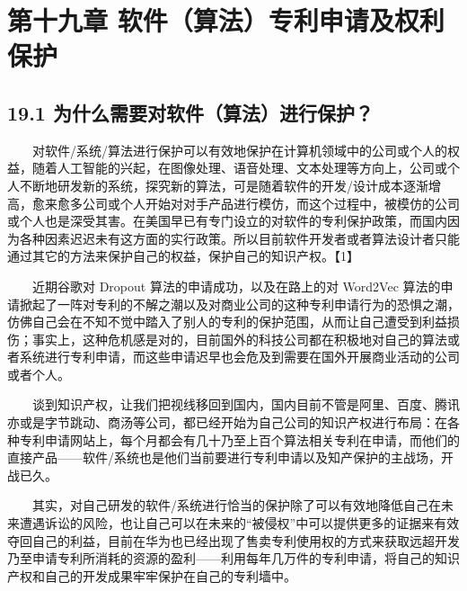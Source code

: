 \chapter{第十九章
软件（算法）专利申请及权利保护}\label{ux7b2cux5341ux4e5dux7ae0-ux8f6fux4ef6ux7b97ux6cd5ux4e13ux5229ux7533ux8bf7ux53caux6743ux5229ux4fddux62a4}


\section{19.1
为什么需要对软件（算法）进行保护？}\label{ux4e3aux4ec0ux4e48ux9700ux8981ux5bf9ux8f6fux4ef6ux7b97ux6cd5ux8fdbux884cux4fddux62a4}

  对软件/系统/算法进行保护可以有效地保护在计算机领域中的公司或个人的权益，随着人工智能的兴起，在图像处理、语音处理、文本处理等方向上，公司或个人不断地研发新的系统，探究新的算法，可是随着软件的开发/设计成本逐渐增高，愈来愈多公司或个人开始对对手产品进行模仿，而这个过程中，被模仿的公司或个人也是深受其害。在美国早已有专门设立的对软件的专利保护政策，而国内因为各种因素迟迟未有这方面的实行政策。所以目前软件开发者或者算法设计者只能通过其它的方法来保护自己的权益，保护自己的知识产权。【1】

  近期谷歌对 Dropout 算法的申请成功，以及在路上的对 Word2Vec
算法的申请掀起了一阵对专利的不解之潮以及对商业公司的这种专利申请行为的恐惧之潮，仿佛自己会在不知不觉中踏入了别人的专利的保护范围，从而让自己遭受到利益损伤；事实上，这种危机感是对的，目前国外的科技公司都在积极地对自己的算法或者系统进行专利申请，而这些申请迟早也会危及到需要在国外开展商业活动的公司或者个人。

  谈到知识产权，让我们把视线移回到国内，国内目前不管是阿里、百度、腾讯亦或是字节跳动、商汤等公司，都已经开始为自己公司的知识产权进行布局：在各种专利申请网站上，每个月都会有几十乃至上百个算法相关专利在申请，而他们的直接产品------软件/系统也是他们当前要进行专利申请以及知产保护的主战场，开战已久。

  其实，对自己研发的软件/系统进行恰当的保护除了可以有效地降低自己在未来遭遇诉讼的风险，也让自己可以在未来的``被侵权''中可以提供更多的证据来有效夺回自己的利益，目前在华为也已经出现了售卖专利使用权的方式来获取远超开发乃至申请专利所消耗的资源的盈利------利用每年几万件的专利申请，将自己的知识产权和自己的开发成果牢牢保护在自己的专利墙中。

